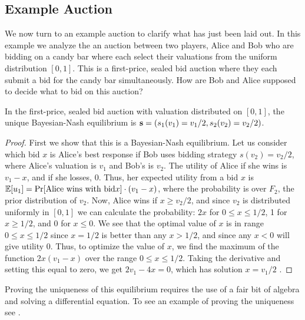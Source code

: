 \documentclass[12pt,twoside]{reedthesis}
\begin{document}
\subsection{Example Auction}
We now turn to an example auction to clarify what has just been laid out. In this example we analyze the an auction between two players, Alice and Bob who are bidding on a candy bar where each select their valuations from the uniform distribution $[0,1]$. This is a first-price, sealed bid auction where they each submit a bid for the candy bar simultaneously. How are Bob and Alice supposed to decide what to bid on this auction? 

\begin{prop}
	In the first-price, sealed bid auction with valuation distributed on $[0,1]$, the unique Bayesian-Nash equilibrium is $\textbf{s} = (s_1(v_1) = v_1 / 2, s_2(v_2) = v_2 / 2)$.
\end{prop}

\begin{proof}
	First we show that this is a Bayesian-Nash equilibrium. Let us consider which bid $x$ is Alice's best response if Bob uses bidding strategy $s(v_2) = v_2/2$, where Alice's valuation is $v_1$ and Bob's is $v_2$. The utility of Alice if she wins is $v_1 - x$, and if she losses, $0$. Thus, her expected utility from a bid $x$ is $\mathbb{E}[u_1] = \Pr[\text{Alice wins with bid} x] \cdot (v_1 -x)$, where the probability is over $F_2$, the prior distribution of $v_2$. Now, Alice wins if $x \geq v_2/2$, and since $v_2$ is distributed uniformly in $[0,1]$ we can calculate the probability: $2x$ for $0 \leq x \leq 1/2$, 1 for $ x \geq 1/2$, and $0$ for $x \leq 0$. We see that the optimal value of $x$ is in range $0 \leq x \leq 1/2$ since $x = 1/2$ is better than any $x > 1/2$, and since any $x < 0$ will give utility $0$. Thus, to optimize the value of $x$, we find the maximum of the function $2x(v_1 - x)$ over the range $0 \leq x \leq 1/2$. Taking the derivative and setting this equal to zero, we get $2v_1 - 4x = 0$, which has solution $x = v_1/2$  \citep{Nisan2007}.
\end{proof}

Proving the uniqueness of this equilibrium requires the use of a fair bit of algebra and solving a differential equation. To see an example of proving the uniqueness see \citet{Levin2002}.
\end{document}
